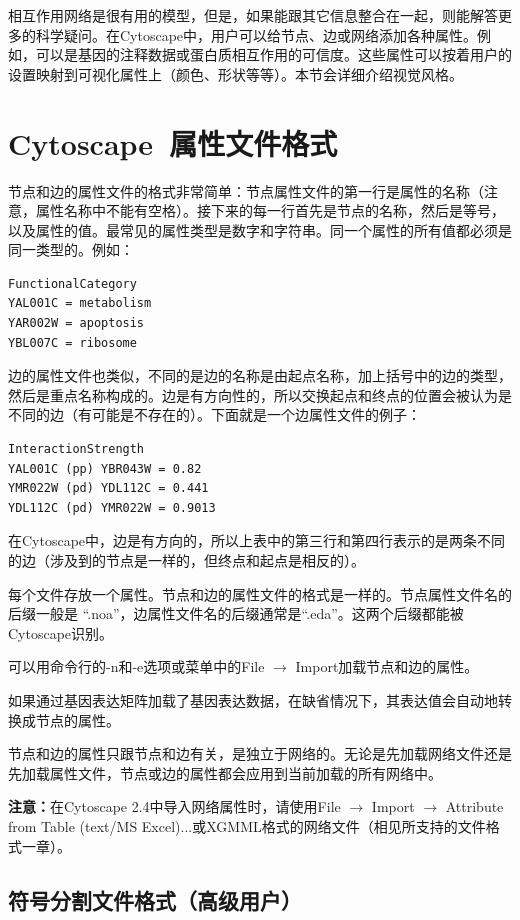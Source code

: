 相互作用网络是很有用的模型，但是，如果能跟其它信息整合在一起，则能解答更多的科学疑问。在Cytoscape中，用户可以给节点、边或网络添加各种属性。例如，可以是基因的注释数据或蛋白质相互作用的可信度。这些属性可以按着用户的设置映射到可视化属性上（颜色、形状等等）。本节会详细介绍视觉风格。

\section{Cytoscape~属性文件格式}
节点和边的属性文件的格式非常简单：节点属性文件的第一行是属性的名称（注意，属性名称中不能有空格）。接下来的每一行首先是节点的名称，然后是等号，以及属性的值。最常见的属性类型是数字和字符串。同一个属性的所有值都必须是同一类型的。例如：

 \begin{verbatim}
FunctionalCategory
YAL001C = metabolism
YAR002W = apoptosis
YBL007C = ribosome
\end{verbatim}

边的属性文件也类似，不同的是边的名称是由起点名称，加上括号中的边的类型，然后是重点名称构成的。边是有方向性的，所以交换起点和终点的位置会被认为是不同的边（有可能是不存在的）。下面就是一个边属性文件的例子：

 \begin{verbatim}
InteractionStrength
YAL001C (pp) YBR043W = 0.82
YMR022W (pd) YDL112C = 0.441
YDL112C (pd) YMR022W = 0.9013
\end{verbatim}

在Cytoscape中，边是有方向的，所以上表中的第三行和第四行表示的是两条不同的边（涉及到的节点是一样的，但终点和起点是相反的）。

每个文件存放一个属性。节点和边的属性文件的格式是一样的。节点属性文件名的后缀一般是
``.noa''，边属性文件名的后缀通常是``.eda''。这两个后缀都能被Cytoscape识别。

可以用命令行的-n和-e选项或菜单中的File $\rightarrow$ Import加载节点和边的属性。

如果通过基因表达矩阵加载了基因表达数据，在缺省情况下，其表达值会自动地转换成节点的属性。

节点和边的属性只跟节点和边有关，是独立于网络的。无论是先加载网络文件还是先加载属性文件，节点或边的属性都会应用到当前加载的所有网络中。

\textbf{注意：}在Cytoscape 2.4中导入网络属性时，请使用File $\rightarrow$ Import $\rightarrow$ Attribute from Table (text/MS Excel)...或XGMML格式的网络文件（相见所支持的文件格式一章）。

\subsection{符号分割文件格式（高级用户）}

